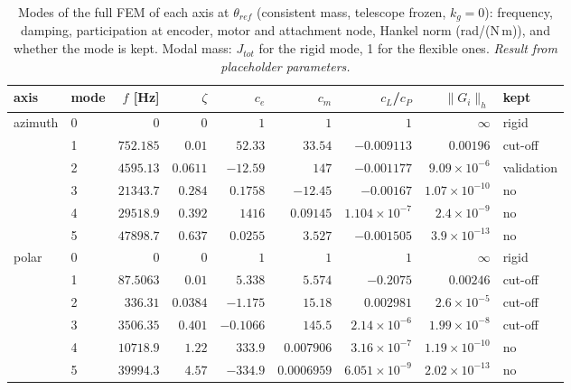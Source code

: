 \documentclass[10pt,a4paper]{article}
\numberwithin{equation}{section}
\begin{document}
\begin{table}[H]\centering\small
\caption{Modes of the full FEM of each axis at $\theta_{ref}$ (consistent mass, telescope frozen, $k_g = 0$): frequency, damping, participation at encoder, motor and attachment node, Hankel norm (rad/(N\,m)), and whether the mode is kept. Modal mass: $J_{tot}$ for the rigid mode, 1 for the flexible ones. \emph{Result from placeholder parameters.}}\label{tab:modal_modes}
\begin{tabular}{llrrrrrrl}\toprule
axis & mode & $f$ [Hz] & $\zeta$ & $c_e$ & $c_m$ & $c_{L}$/$c_P$ & $\|G_i\|_h$ & kept \\ \midrule
azimuth & 0 & $0$ & $0$ & $1$ & $1$ & $1$ & $\infty$ & rigid \\
 & 1 & $752.185$ & $0.01$ & $52.33$ & $33.54$ & $-0.009113$ & $0.00196$ & cut-off \\
 & 2 & $4595.13$ & $0.0611$ & $-12.59$ & $147$ & $-0.001177$ & $9.09\times10^{-6}$ & validation \\
 & 3 & $21343.7$ & $0.284$ & $0.1758$ & $-12.45$ & $-0.00167$ & $1.07\times10^{-10}$ & no \\
 & 4 & $29518.9$ & $0.392$ & $1416$ & $0.09145$ & $1.104\times10^{-7}$ & $2.4\times10^{-9}$ & no \\
 & 5 & $47898.7$ & $0.637$ & $0.0255$ & $3.527$ & $-0.001505$ & $3.9\times10^{-13}$ & no \\
\midrule
polar & 0 & $0$ & $0$ & $1$ & $1$ & $1$ & $\infty$ & rigid \\
 & 1 & $87.5063$ & $0.01$ & $5.338$ & $5.574$ & $-0.2075$ & $0.00246$ & cut-off \\
 & 2 & $336.31$ & $0.0384$ & $-1.175$ & $15.18$ & $0.002981$ & $2.6\times10^{-5}$ & cut-off \\
 & 3 & $3506.35$ & $0.401$ & $-0.1066$ & $145.5$ & $2.14\times10^{-6}$ & $1.99\times10^{-8}$ & cut-off \\
 & 4 & $10718.9$ & $1.22$ & $333.9$ & $0.007906$ & $3.16\times10^{-7}$ & $1.19\times10^{-10}$ & no \\
 & 5 & $39994.3$ & $4.57$ & $-334.9$ & $0.0006959$ & $6.051\times10^{-9}$ & $2.02\times10^{-13}$ & no \\

\bottomrule\end{tabular}\end{table}
\end{document}
